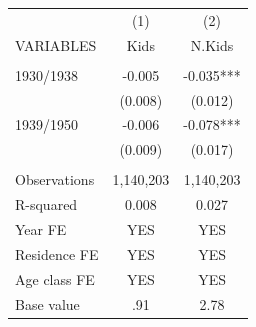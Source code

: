 \begin{tabular}{lcc} \hline
 & (1) & (2) \\
VARIABLES & Kids & N.Kids \\ \hline
 &  &  \\
1930/1938 & -0.005 & -0.035*** \\
 & (0.008) & (0.012) \\
1939/1950 & -0.006 & -0.078*** \\
 & (0.009) & (0.017) \\
 &  &  \\
Observations & 1,140,203 & 1,140,203 \\
R-squared & 0.008 & 0.027 \\
Year FE & YES & YES \\
Residence FE & YES & YES \\
Age class FE & YES & YES \\
 Base value & .91 & 2.78 \\ \hline
\end{tabular}
